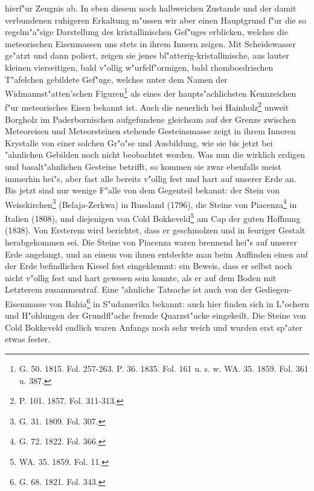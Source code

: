 \documentclass[a4paper, 8pt, oneside, polutonikogreek, german]{article}
\begin{document}
hierf"ur Zeugnis ab. In eben diesem noch halbweichen Zustande und der damit verbundenen ruhigeren Erkaltung m"ussen wir aber einen Hauptgrund f"ur die so regelm"a"sige Darstellung des kristallinischen Gef"uges erblicken, welches die meteorischen Eisenmassen uns stets in ihrem Innern zeigen. Mit Scheidewasser ge"atzt und dann poliert, zeigen sie jenes bl"atterig-kristallinische, aus lauter kleinen vierseitigen, bald v"ollig w"urfelf"ormigen, bald rhomboedrischen T"afelchen gebildete Gef"uge, welches unter dem Namen der Widmannst"atten'schen Figuren\footnote{G. 50. 1815. Fol. 257-263. P. 36. 1835. Fol. 161 u. s. w. WA. 35. 1859. Fol. 361 u. 387.} als eines der haupts"achlichsten Kennzeichen f"ur meteorisches Eisen bekannt ist. Auch die neuerlich bei Hainholz\footnote{P. 101. 1857. Fol. 311-313.} unweit Borgholz im Paderbornischen aufgefundene gleichsam auf der Grenze zwischen Meteoreisen und Meteorsteinen stehende Gesteinsmasse zeigt in ihrem Inneren Krystalle von einer solchen Gr"o"se und Ausbildung, wie sie bis jetzt bei "ahnlichen Gebilden noch nicht beobachtet worden. Was nun die wirklich erdigen und basalt"ahnlichen Gesteine betrifft, so kommen sie zwar ebenfalls meist immerhin hei"s, aber fast alle bereits v"ollig fest und hart auf unserer Erde an. Bis jetzt sind nur wenige F"alle von dem Gegenteil bekannt: der Stein von Weisskirchen\footnote{G. 31. 1809. Fol. 307.} (Belaja-Zerkwa) in Russland (1796), die Steine von Piacenza\footnote{G. 72. 1822. Fol. 366.} in Italien (1808), und diejenigen von Cold Bokkeveld\footnote{WA. 35. 1859. Fol. 11.} am Cap der guten Hoffnung (1838). Von Ersterem wird berichtet, dass er geschmolzen und in feuriger Gestalt herabgekommen sei. Die Steine von Piacenza waren brennend hei"s auf unserer Erde angelangt, und an einem von ihnen entdeckte man beim Auffinden einen auf der Erde befindlichen Kiesel fest eingeklemmt: ein Beweis, dass er selbst noch nicht v"ollig fest und hart gewesen sein konnte, als er auf dem Boden mit Letzterem zusammentraf. Eine "ahnliche Tatsache ist auch von der Gediegen-Eisenmasse von Bahia\footnote{G. 68. 1821. Fol. 343.} in S"udamerika bekannt: auch hier finden sich in L"ochern und H"ohlungen der Grundfl"ache fremde Quarzst"ucke eingekeilt. Die Steine von Cold Bokkeveld endlich waren Anfangs noch sehr weich und wurden erst sp"ater etwas fester.
\end{document}
